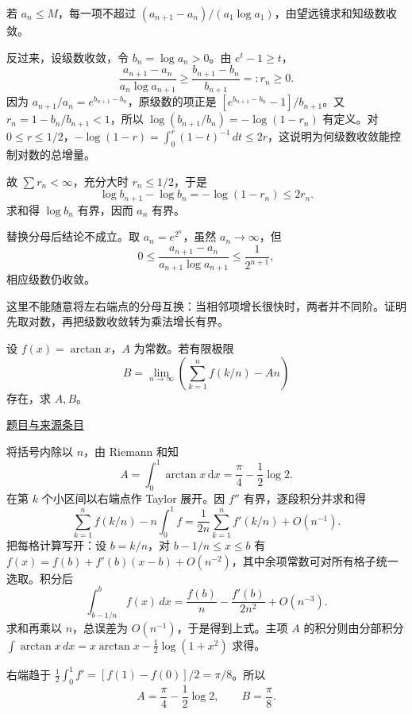 \documentclass[12pt,fontset=fandol]{ctexart}
\begin{document}
\begin{solve}\label{ans:pre09-math:2}

若 $a_n\le M$，每一项不超过 $(a_{n+1}-a_n)/(a_1\log a_1)$，由望远镜求和知级数收敛。

反过来，设级数收敛，令 $b_n=\log a_n>0$。由 $e^t-1\ge t$，
\[
\frac{a_{n+1}-a_n}{a_n\log a_{n+1}}
\ge\frac{b_{n+1}-b_n}{b_{n+1}}=:r_n\ge0.
\]
因为 $a_{n+1}/a_n=e^{b_{n+1}-b_n}$，原级数的项正是 $[e^{b_{n+1}-b_n}-1]/b_{n+1}$。又 $r_n=1-b_n/b_{n+1}<1$，所以 $\log(b_{n+1}/b_n)=-\log(1-r_n)$ 有定义。对 $0\le r\le1/2$，$-\log(1-r)=\int_0^r(1-t)^{-1}\,dt\le2r$，这说明为何级数收敛能控制对数的总增量。

故 $\sum r_n<\infty$，充分大时 $r_n\le1/2$，于是
\[
\log b_{n+1}-\log b_n=-\log(1-r_n)\le2r_n.
\]
求和得 $\log b_n$ 有界，因而 $a_n$ 有界。

替换分母后结论不成立。取 $a_n=e^{2^n}$，虽然 $a_n\to\infty$，但
\[
0\le\frac{a_{n+1}-a_n}{a_{n+1}\log a_{n+1}}
\le\frac1{2^{n+1}},
\]
相应级数仍收敛。

\end{solve}

\begin{remark}[方法与条件]这里不能随意将左右端点的分母互换：当相邻项增长很快时，两者并不同阶。证明先取对数，再把级数收敛转为乘法增长有界。\end{remark}

\begin{example}[来源序号5]\label{ex:pre09-math:5}\label{pr:pre09-math:5}

设 $f(x)=\arctan x$，$A$ 为常数。若有限极限
\[
B=\lim_{n\to\infty}\left(\sum_{k=1}^nf(k/n)-An\right)
\]
存在，求 $A,B$。

\par\href{https://github.com/lzxcr/cmc-mathematics/blob/64916fa1fdbc3e444a652eca204d5669058ee321/src/problems/preliminary/09/05.md}{题目与来源条目}

\end{example}

\begin{solve}\label{ans:pre09-math:5}

将括号内除以 $n$，由 Riemann 和知
\[
A=\int_0^1\arctan x\,\mathrm dx=\frac\pi4-\frac12\log2.
\]
在第 $k$ 个小区间以右端点作 Taylor 展开。因 $f''$ 有界，逐段积分并求和得
\[
\sum_{k=1}^nf(k/n)-n\int_0^1f
=\frac1{2n}\sum_{k=1}^nf'(k/n)+O(n^{-1}).
\]
把每格计算写开：设 $b=k/n$，对 $b-1/n\le x\le b$ 有 $f(x)=f(b)+f'(b)(x-b)+O(n^{-2})$，其中余项常数可对所有格子统一选取。积分后
\[
\int_{b-1/n}^bf(x)\,dx=\frac{f(b)}n-\frac{f'(b)}{2n^2}+O(n^{-3}).
\]
求和再乘以 $n$，总误差为 $O(n^{-1})$，于是得到上式。主项 $A$ 的积分则由分部积分 $\int\arctan x\,dx=x\arctan x-\tfrac12\log(1+x^2)$ 求得。

右端趋于 $\frac12\int_0^1f'=[f(1)-f(0)]/2=\pi/8$。所以
\[
\boxed{A=\frac\pi4-\frac12\log2,\qquad B=\frac\pi8}.
\]

\end{solve}
\end{document}
